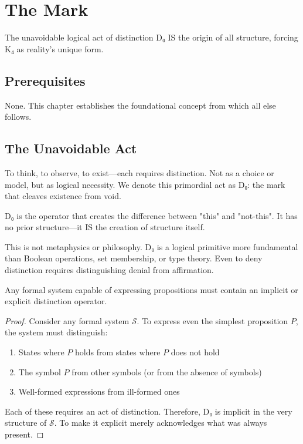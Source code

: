 \chapter{The Mark}
\label{chap:mark}

The unavoidable logical act of distinction D₀ IS the origin of all structure, forcing K₄ as reality's unique form.

\section{Prerequisites}
None. This chapter establishes the foundational concept from which all else follows.

\section{The Unavoidable Act}
\label{sec:unavoidable}

To think, to observe, to exist—each requires distinction. Not as a choice or model, but as logical necessity. We denote this primordial act as D₀: the mark that cleaves existence from void.

\begin{definition}
\label{def:distinction}
D₀ is the operator that creates the difference between "this" and "not-this". It has no prior structure—it IS the creation of structure itself.
\end{definition}

This is not metaphysics or philosophy. D₀ is a logical primitive more fundamental than Boolean operations, set membership, or type theory. Even to deny distinction requires distinguishing denial from affirmation.

\begin{theorem}
\label{thm:unavoidable}
Any formal system capable of expressing propositions must contain an implicit or explicit distinction operator.
\end{theorem}

\begin{proof}
Consider any formal system $\mathcal{S}$. To express even the simplest proposition $P$, the system must distinguish:
\begin{enumerate}
\item States where $P$ holds from states where $P$ does not hold
\item The symbol $P$ from other symbols (or from the absence of symbols)
\item Well-formed expressions from ill-formed ones
\end{enumerate}
Each of these requires an act of distinction. Therefore, D₀ is implicit in the very structure of $\mathcal{S}$. To make it explicit merely acknowledges what was always present.
\end{proof}

